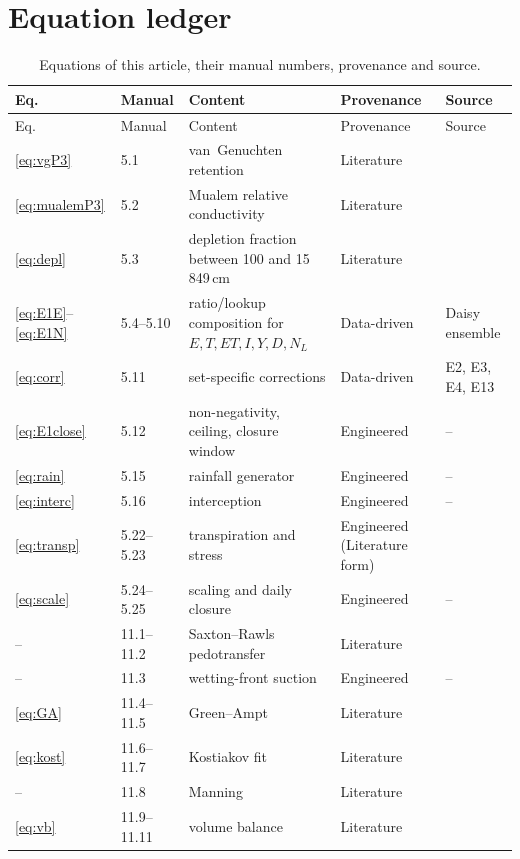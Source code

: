 \section{Equation ledger}\label{app:ledger}
\begin{longtable}{p{1.7cm}p{1.6cm}p{4.9cm}p{2.2cm}p{3.4cm}}
\caption{Equations of this article, their manual numbers, provenance and source.}\\
\toprule
Eq. & Manual & Content & Provenance & Source\\\midrule\endfirsthead
\toprule Eq. & Manual & Content & Provenance & Source\\\midrule\endhead
\cref{eq:vgP3} & 5.1 & van~Genuchten retention & Literature & \citet{vanGenuchten1980}\\
\cref{eq:mualemP3} & 5.2 & Mualem relative conductivity & Literature & \citet{Mualem1976}\\
\cref{eq:depl} & 5.3 & depletion fraction between 100 and 15\,849\,cm & Literature & \citet{Allen1998}\\
\cref{eq:E1E}--\cref{eq:E1N} & 5.4--5.10 & ratio/lookup composition for $E,T,\mathit{ET},I,Y,D,N_L$ & Data-driven & Daisy ensemble\\
\cref{eq:corr} & 5.11 & set-specific corrections & Data-driven & E2, E3, E4, E13\\
\cref{eq:E1close} & 5.12 & non-negativity, ceiling, closure window & Engineered & --\\
\cref{eq:rain} & 5.15 & rainfall generator & Engineered & --\\
\cref{eq:interc} & 5.16 & interception & Engineered & --\\
\cref{eq:transp} & 5.22--5.23 & transpiration and stress & Engineered (Literature form) & \citet{Allen1998}\\
\cref{eq:scale} & 5.24--5.25 & scaling and daily closure & Engineered & --\\
-- & 11.1--11.2 & Saxton--Rawls pedotransfer & Literature & \citet{Saxton2006}\\
-- & 11.3 & wetting-front suction & Engineered & --\\
\cref{eq:GA} & 11.4--11.5 & Green--Ampt & Literature & \citet{GreenAmpt1911}\\
\cref{eq:kost} & 11.6--11.7 & Kostiakov fit & Literature & \citet{Kostiakov1932}\\
-- & 11.8 & Manning & Literature & \citet{Manning1891}\\
\cref{eq:vb} & 11.9--11.11 & volume balance & Literature & \citet{Walker1987,Elliott1982}\\

\end{longtable}
